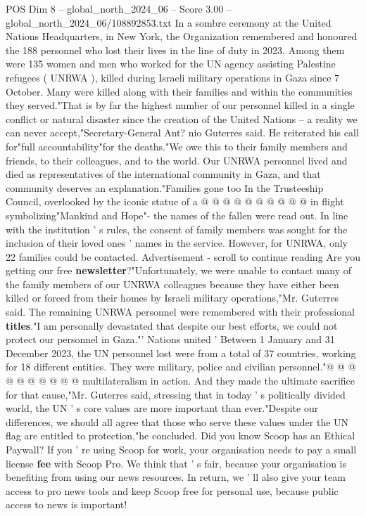 \begin{textsample}{POS Dim 8 – global\_north\_2024\_06 – Score 3.00 – global\_north\_2024\_06/108892853.txt}  \label{ex:f8_pos_260}
In a sombre ceremony at the United Nations Headquarters, in New York, the Organization remembered and honoured the 188 personnel who lost their lives in the line of duty in 2023.
Among them were 135 women and men who worked for the UN agency assisting Palestine refugees ( UNRWA ), killed during Israeli military operations in Gaza since 7 October.
Many were killed along with their families and within the communities they served."That is by far the highest number of our personnel killed in a single conflict or natural disaster since the creation of the United Nations -- a reality we can never accept,"Secretary-General Ant? nio Guterres said.
He reiterated his call for"full accountability"for the deaths."We owe this to their family members and friends, to their colleagues, and to the world.
Our UNRWA personnel lived and died as representatives of the international community in Gaza, and that community deserves an explanation."Families gone too In the Trusteeship Council, overlooked by the iconic statue of a @ @ @ @ @ @ @ @ @ @ in flight symbolizing"Mankind and Hope"- the names of the fallen were read out.
In line with the institution ' s rules, the consent of family members was sought for the inclusion of their loved ones ' names in the service.
However, for UNRWA, only 22 families could be contacted.
Advertisement - scroll to continue reading Are you getting our free \textbf{newsletter}?"Unfortunately, we were unable to contact many of the family members of our UNRWA colleagues because they have either been killed or forced from their homes by Israeli military operations,"Mr.
Guterres said.
The remaining UNRWA personnel were remembered with their professional \textbf{titles}."I am personally devastated that despite our best efforts, we could not protect our personnel in Gaza."' Nations united ' Between 1 January and 31 December 2023, the UN personnel lost were from a total of 37 countries, working for 18 different entities.
They were military, police and civilian personnel."@ @ @ @ @ @ @ @ @ @ multilateralism in action.
And they made the ultimate sacrifice for that cause,"Mr.
Guterres said, stressing that in today ' s politically divided world, the UN ' s core values are more important than ever."Despite our differences, we should all agree that those who serve these values under the UN flag are entitled to protection,"he concluded.
Did you know Scoop has an Ethical Paywall?
If you ' re using Scoop for work, your organisation needs to pay a small license \textbf{fee} with Scoop Pro.
We think that ' s fair, because your organisation is benefiting from using our news resources.
In return, we ' ll also give your team access to pro news tools and keep Scoop free for personal use, because public access to news is important!

\end{textsample}
